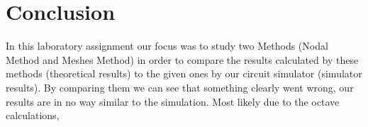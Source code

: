 \section{Conclusion}
\label{sec:conclusion}

In this laboratory assignment our focus was to study two Methods (Nodal Method and Meshes Method) in order to compare the results calculated by these methods (theoretical results) to the given ones by our circuit simulator (simulator results). By comparing them we can see that something clearly went wrong, our results are in no way similar to the simulation. Most likely due to the octave calculations,

